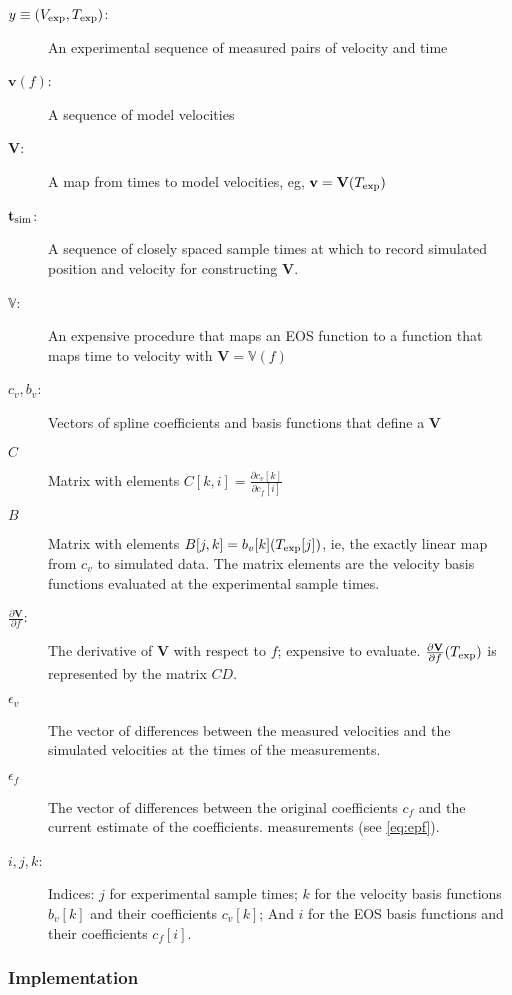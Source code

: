 \documentclass[11pt]{article}
\newcommand{\partiald}[2]{\frac{\partial #1}{\partial #2}}
\newcommand\bv{\mathbf{v}}
\newcommand{\eos}{f}
\newcommand\Vfunc{\mathbb{V}}
\newcommand\Vt{\mathbf{V}}
\newcommand\vexp{V_{\rm{exp}}}
\newcommand\texp{T_{\rm{exp}}}
\newcommand\cf{c_f}
\newcommand\cv{c_v}
\newcommand\vbasis{b_v}
\newcommand\tsim{{\mathbf t}_{\rm{sim}}}
\newcommand\DVDf{\partiald{\Vt}{f}}
\newcommand\epv{\epsilon_v}
\newcommand\epf{\epsilon_f}
\begin{document}
\begin{description}
\item[$y\equiv(\vexp, \texp)$:] An experimental sequence of measured pairs of
  velocity and time
\item[$\bv(\eos)$:] A sequence of model velocities
\item[$\Vt$:] A map from times to model velocities, eg, $\bv =
  \Vt(\texp)$
\item[$\tsim$:] A sequence of closely spaced sample times at which to record
  simulated position and velocity for constructing $\Vt$.
\item[$\Vfunc$:] An expensive procedure that maps an EOS function to a
  function that maps time to velocity with $\Vt = \Vfunc(\eos)$
\item[$\cv,\vbasis$:] Vectors of spline coefficients and basis functions
  that define a $\Vt$
\item[$C$] Matrix with elements $C[k,i] = \partiald{\cv[k]}{\cf[i]}$
\item[$B$] Matrix with elements $B[j,k] = \vbasis[k](\texp[j])$, ie,
  the exactly linear map from $c_v$ to simulated data.  The matrix
  elements are the velocity basis functions evaluated at the
  experimental sample times.
\item[$\DVDf$:] The derivative of $\Vt$ with respect to $f$; expensive
  to evaluate.  $\DVDf (\texp)$ is represented by the matrix $CD$.
\item[$\epv$] The vector of differences between the measured
  velocities and the simulated velocities at the times of the
  measurements.
\item[$\epf$] The vector of differences between the original
  coefficients $c_f$ and the current estimate of the coefficients.
  measurements (see \eqref{eq:epf}).
\item[$i,j,k$:] Indices: $j$ for experimental sample times; $k$ for
  the velocity basis functions $\vbasis[k]$ and their coefficients
  $\cv[k]$; And $i$ for the EOS basis functions and their coefficients
  $\cf[i]$.
\end{description}

\subsubsection{Implementation}
\label{sec:basic_implementation}
\end{document}
